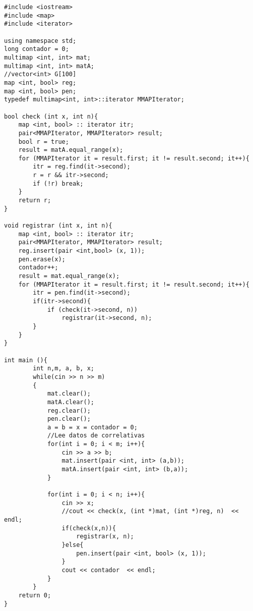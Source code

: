 \begin{verbatim}
#include <iostream>
#include <map>
#include <iterator>

using namespace std;
long contador = 0;
multimap <int, int> mat;
multimap <int, int> matA;
//vector<int> G[100]
map <int, bool> reg;
map <int, bool> pen;
typedef multimap<int, int>::iterator MMAPIterator;

bool check (int x, int n){
	map <int, bool> :: iterator itr;
	pair<MMAPIterator, MMAPIterator> result;
	bool r = true;
	result = matA.equal_range(x);
	for (MMAPIterator it = result.first; it != result.second; it++){
		itr = reg.find(it->second);
		r = r && itr->second;
		if (!r) break;
	}
	return r;
}

void registrar (int x, int n){
	map <int, bool> :: iterator itr;
	pair<MMAPIterator, MMAPIterator> result;
	reg.insert(pair <int,bool> (x, 1));
	pen.erase(x);
	contador++;
	result = mat.equal_range(x);
	for (MMAPIterator it = result.first; it != result.second; it++){
		itr = pen.find(it->second);
		if(itr->second){
			if (check(it->second, n))
				registrar(it->second, n);
		}
	}
}

int main (){
		int n,m, a, b, x;
		while(cin >> n >> m)
		{
			mat.clear();
			matA.clear();
			reg.clear();
			pen.clear();
			a = b = x = contador = 0;
			//Lee datos de correlativas
			for(int i = 0; i < m; i++){
				cin >> a >> b;
				mat.insert(pair <int, int> (a,b));
				matA.insert(pair <int, int> (b,a));
			}

			for(int i = 0; i < n; i++){
				cin >> x;
				//cout << check(x, (int *)mat, (int *)reg, n)  << endl;
				if(check(x,n)){
					registrar(x, n);
				}else{
					pen.insert(pair <int, bool> (x, 1));
				}
				cout << contador  << endl;
			}
		}
	return 0;
}
\end{verbatim}
